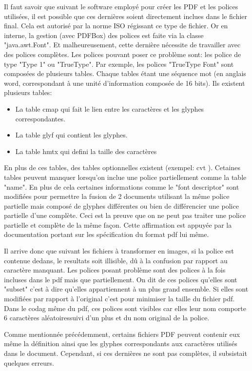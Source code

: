 Il faut savoir que suivant le software employé pour créer les PDF et
les polices utilisées, il est possible que ces dernières soient directement
inclues dans le fichier final. Cela est autorisé par la norme ISO régissant 
ce type de fichier. Or en interne, la gestion (avec PDFBox) des polices est faite via la 
classe "java.awt.Font". Et malheureusement, cette dernière nécessite de travailler
avec des polices complètes.  Les polices pouvant poser ce problème sont: les police de type "Type 1" ou
"TrueType".
Par exemple, les polices "TrueType Font" sont composées de plusieurs tables. Chaque 
tables étant une séquence mot (en anglais word, correspondant à une unité d'information composée de 
16 bits). Ils existent plusieurs tables:
\begin{itemize}
\item La table cmap qui fait le lien entre les caractères et les glyphes correspondantes.
\item La table glyf qui contient les glyphes.
\item La table hmtx qui defini la taille des caractères
\end{itemize}
En plus de ces tables, des tables optionnelles existent (exempel: cvt ).
Cetaines tables peuvent manquer lorsqu'on inclue une police partiellement comme la table "name".
En plus de cela certaines informations comme le "font descriptor" sont modifiées pour permettre la fusion de 2 documents
utilisant la même police partielle mais composé de glyphes différentes ou bien de différencier une police partielle d'une complète.
Ceci est la preuve que on ne peut pas traiter une police partielle et complète de la même façon. Cette affirmation est appuyée par
la documentation portant sur les spécification du format pdf lui même.


Il arrive donc que suivant les fichiers à transformer en images, si la police 
est contenue dedans, le resultats soit illisible, dû à la confusion par rapport
au caractère manquant. 
Les polices posant problème sont des polices à la fois incluses dans le pdf mais que
partiellement. On dit de ces polices qu'elles sont "subset" c'est à dire qu'elles appartiennent
à un plus grand ensemble. Si elles sont modifiées par rapport à l'original c'est pour
minimiser la taille du fichier pdf. Dans le codag même du pdf, ces polices sont visibles 
car elles leur nom comporte 6 caractères aléatoiressuivi d'un plus et du nom original 
de la police.

Comme mentionnée précédemment, certains fichiers PDF peuvent contenir eux 
même la définition ainsi que les glyphes correspondants aux caractères utilisés dans 
le document. Cependant, si ces dernières ne sont pas complètes, il subsistait
quelques erreurs.

